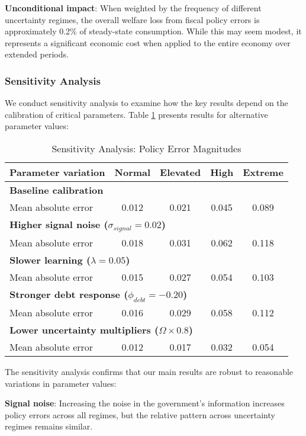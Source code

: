\documentclass[5p,authoryear]{elsarticle}
\begin{document}
\textbf{Unconditional impact}: When weighted by the frequency of different uncertainty regimes, the overall welfare loss from fiscal policy errors is approximately 0.2\% of steady-state consumption. While this may seem modest, it represents a significant economic cost when applied to the entire economy over extended periods.

\subsubsection{Sensitivity Analysis}

We conduct sensitivity analysis to examine how the key results depend on the calibration of critical parameters. Table \ref{tab:sensitivity} presents results for alternative parameter values:

\begin{table}[h!]
\centering
\caption{Sensitivity Analysis: Policy Error Magnitudes}
\label{tab:sensitivity}
\begin{tabular}{lcccc}
\toprule
Parameter variation & Normal & Elevated & High & Extreme \\
\midrule
\multicolumn{5}{l}{\textbf{Baseline calibration}} \\
Mean absolute error & 0.012 & 0.021 & 0.045 & 0.089 \\
\midrule
\multicolumn{5}{l}{\textbf{Higher signal noise ($\sigma_{signal} = 0.02$)}} \\
Mean absolute error & 0.018 & 0.031 & 0.062 & 0.118 \\
\midrule
\multicolumn{5}{l}{\textbf{Slower learning ($\lambda = 0.05$)}} \\
Mean absolute error & 0.015 & 0.027 & 0.054 & 0.103 \\
\midrule
\multicolumn{5}{l}{\textbf{Stronger debt response ($\phi_{debt} = -0.20$)}} \\
Mean absolute error & 0.016 & 0.029 & 0.058 & 0.112 \\
\midrule
\multicolumn{5}{l}{\textbf{Lower uncertainty multipliers ($\Omega \times 0.8$)}} \\
Mean absolute error & 0.012 & 0.017 & 0.032 & 0.054 \\
\bottomrule
\end{tabular}
\end{table}

The sensitivity analysis confirms that our main results are robust to reasonable variations in parameter values:

\textbf{Signal noise}: Increasing the noise in the government's information increases policy errors across all regimes, but the relative pattern across uncertainty regimes remains similar.
\end{document}
